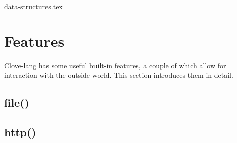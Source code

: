 \documentclass[12pt,a4paper]{article}
\begin{document}
{data-structures.tex}









\section*{Features}
Clove-lang has some useful built-in features, a couple of which allow for interaction with the outside world. This section introduces them in detail.


\subsection*{file()}


\subsection*{http()}
\end{document}
